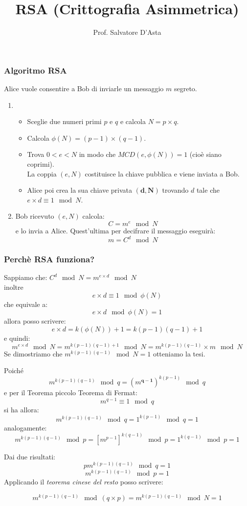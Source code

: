 \documentclass{beamer}
\title{RSA (Crittografia Asimmetrica)}
\author{Prof. Salvatore D'Asta}
\begin{document}
\begin{frame}
\maketitle
\end{frame}

\begin{frame}
\frametitle{Algoritmo RSA}
Alice vuole consentire a Bob di inviarle un messaggio $ m $ segreto.
\begin{enumerate}
	\item 
	\begin{itemize}
		\item Sceglie due numeri primi $ p $ e $ q $ e calcola $ N=p\times q $.
		\item Calcola $ \phi(N)=(p-1)\times (q-1) $. 
		\item Trova $ 0<e<N $ in modo che $ MCD(e,\phi(N))=1 $ (cioè siano coprimi).\\ La coppia $ (e,N) $ costituisce la chiave pubblica e viene inviata a Bob.
		\item Alice poi crea la sua chiave privata $ \mathbf{(d,N)} $ trovando $ d $ tale che $ \boxed{e\times d\equiv 1 \mod N } $.
	\end{itemize}
	\item Bob ricevuto $ (e,N) $ calcola: \[ C=m^e \mod N \] e lo invia a Alice. Quest'ultima per decifrare il messaggio eseguirà:\[ m=C^d \mod N \]
\end{enumerate}
\end{frame}

\begin{frame}
\frametitle{Perchè RSA funziona?}
Sappiamo che:
  $  C^d \mod N=m^{e\times d} \mod N$\\ inoltre  \[\boxed{ e\times d \equiv1 \mod \phi(N)} \] che equivale a:\[ e\times d \mod \phi(N) =1 \]
allora posso scrivere: \[ e\times d=k(\phi(N))+1=k(p-1)(q-1)+1 \] e quindi:
\[ m^{e\times d} \mod N=m^{k(p-1)(q-1)+1} 	\mod N=m^{k(p-1)(q-1)}\times m 	\mod N \]
 Se dimostriamo che $\boxed{ m^{k(p-1)(q-1)} 	\mod N=1 }$ otteniamo la tesi.  
\end{frame}
\begin{frame}
Poiché \[m^{k(p-1)(q-1)} 	\mod q=(m^{\mathbf{q-1}}) ^{k(p-1)} 	\mod q  \]
e per il Teorema piccolo Teorema di Fermat: \[\boxed{ m^{q-1} \equiv 1 \mod q} \]
si ha allora: \[ m^{k(p-1)(q-1)} 	\mod q=1^{k(p-1)} 	\mod q=1 \] analogamente:
\[m^{k(p-1)(q-1)} 	\mod p=[m^{p-1}]^{k(q-1)} 	\mod p=1^{k(q-1)} \mod p=1  \]

\end{frame}
\begin{frame}
Dai due risultati: \[  p m^{k(p-1)(q-1)} 	\mod q=1\]  \[  m^{k(p-1)(q-1)} 	\mod p=1  \]
Applicando il \textit{teorema cinese del resto} posso scrivere:

\[ m^{k(p-1)(q-1)} 	\mod (q\times p)= m^{k(p-1)(q-1)} 	\mod N=1 \]  
\end{frame}
\end{document}
